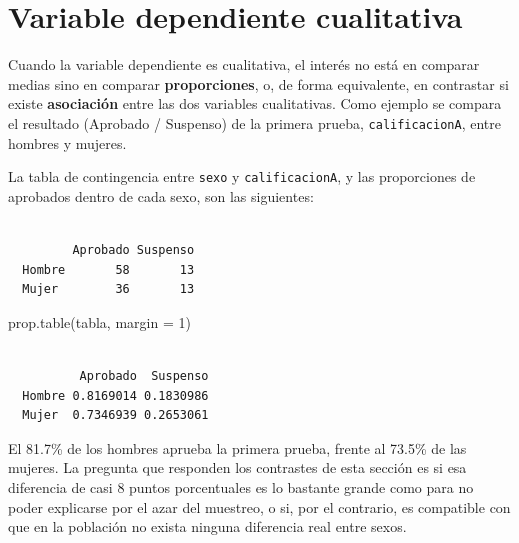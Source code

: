 \documentclass[
  spanish,
  a4paper,
]{scrreport}
\newenvironment{Shaded}{\begin{snugshade}}{\end{snugshade}}
\newcommand{\AttributeTok}[1]{\textcolor[rgb]{0.40,0.45,0.13}{#1}}
\newcommand{\DecValTok}[1]{\textcolor[rgb]{0.68,0.00,0.00}{#1}}
\newcommand{\FunctionTok}[1]{\textcolor[rgb]{0.28,0.35,0.67}{#1}}
\newcommand{\NormalTok}[1]{\textcolor[rgb]{0.00,0.23,0.31}{#1}}
\newcommand{\OtherTok}[1]{\textcolor[rgb]{0.00,0.23,0.31}{#1}}
\newcommand{\SpecialCharTok}[1]{\textcolor[rgb]{0.37,0.37,0.37}{#1}}
\theoremstyle{definition}
\theoremstyle{definition}
\theoremstyle{remark}
\begin{document}
\section{Variable dependiente
cualitativa}\label{variable-dependiente-cualitativa}

Cuando la variable dependiente es cualitativa, el interés no está en
comparar medias sino en comparar \textbf{proporciones}, o, de forma
equivalente, en contrastar si existe \textbf{asociación} entre las dos
variables cualitativas. Como ejemplo se compara el resultado (Aprobado /
Suspenso) de la primera prueba, \texttt{calificacionA}, entre hombres y
mujeres.

La tabla de contingencia entre \texttt{sexo} y \texttt{calificacionA}, y
las proporciones de aprobados dentro de cada sexo, son las siguientes:

\begin{Shaded}
\end{Shaded}

\begin{verbatim}
        
         Aprobado Suspenso
  Hombre       58       13
  Mujer        36       13
\end{verbatim}

\begin{Shaded}
\begin{Highlighting}[]
\FunctionTok{prop.table}\NormalTok{(tabla, }\AttributeTok{margin =} \DecValTok{1}\NormalTok{)}
\end{Highlighting}
\end{Shaded}

\begin{verbatim}
        
          Aprobado  Suspenso
  Hombre 0.8169014 0.1830986
  Mujer  0.7346939 0.2653061
\end{verbatim}

El 81.7\% de los hombres aprueba la primera prueba, frente al 73.5\% de
las mujeres. La pregunta que responden los contrastes de esta sección es
si esa diferencia de casi 8 puntos porcentuales es lo bastante grande
como para no poder explicarse por el azar del muestreo, o si, por el
contrario, es compatible con que en la población no exista ninguna
diferencia real entre sexos.
\end{document}
